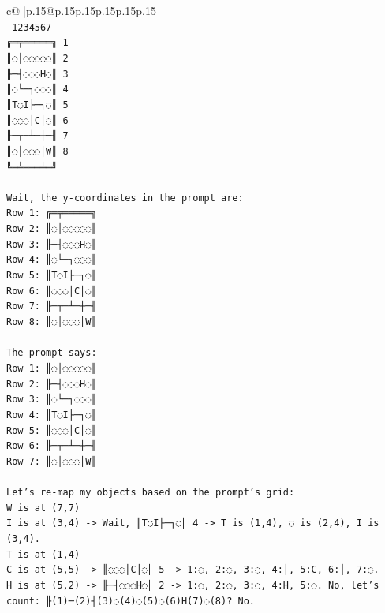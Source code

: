 \documentclass{article}
\begin{document}
{\begin{supertabular}{c@{$\;$}|p{.15\linewidth}@{}p{.15\linewidth}p{.15\linewidth}p{.15\linewidth}p{.15\linewidth}p{.15\linewidth}}
{{{\\ 
\texttt{ 1234567} \\
\texttt{╔═╤═════╗ 1} \\
\texttt{║◌│◌◌◌◌◌║ 2} \\
\texttt{╟─┤◌◌◌H◌║ 3} \\
\texttt{║◌└─┐◌◌◌║ 4} \\
\texttt{║T◌I├─┐◌║ 5} \\
\texttt{║◌◌◌│C│◌║ 6} \\
\texttt{╟─┬─┴─┼─╢ 7} \\
\texttt{║◌│◌◌◌│W║ 8} \\
\texttt{╚═╧═══╧═╝} \\
\\ 
\texttt{Wait, the y{-}coordinates in the prompt are:} \\
\texttt{Row 1: ╔═╤═════╗} \\
\texttt{Row 2: ║◌│◌◌◌◌◌║} \\
\texttt{Row 3: ╟─┤◌◌◌H◌║} \\
\texttt{Row 4: ║◌└─┐◌◌◌║} \\
\texttt{Row 5: ║T◌I├─┐◌║} \\
\texttt{Row 6: ║◌◌◌│C│◌║} \\
\texttt{Row 7: ╟─┬─┴─┼─╢} \\
\texttt{Row 8: ║◌│◌◌◌│W║} \\
\\ 
\texttt{The prompt says:} \\
\texttt{Row 1: ║◌│◌◌◌◌◌║} \\
\texttt{Row 2: ╟─┤◌◌◌H◌║} \\
\texttt{Row 3: ║◌└─┐◌◌◌║} \\
\texttt{Row 4: ║T◌I├─┐◌║} \\
\texttt{Row 5: ║◌◌◌│C│◌║} \\
\texttt{Row 6: ╟─┬─┴─┼─╢} \\
\texttt{Row 7: ║◌│◌◌◌│W║} \\
\\ 
\texttt{Let's re{-}map my objects based on the prompt's grid:} \\
\texttt{W is at (7,7)} \\
\texttt{I is at (3,4) {-}> Wait, ║T◌I├─┐◌║ 4 {-}> T is (1,4), ◌ is (2,4), I is (3,4).} \\
\texttt{T is at (1,4)} \\
\texttt{C is at (5,5) {-}> ║◌◌◌│C│◌║ 5 {-}> 1:◌, 2:◌, 3:◌, 4:│, 5:C, 6:│, 7:◌.} \\
\texttt{H is at (5,2) {-}> ╟─┤◌◌◌H◌║ 2 {-}> 1:◌, 2:◌, 3:◌, 4:H, 5:◌. No, let's count: ╟(1)─(2)┤(3)◌(4)◌(5)◌(6)H(7)◌(8)? No.} \\
}}}
\end{supertabular}}
\end{document}
